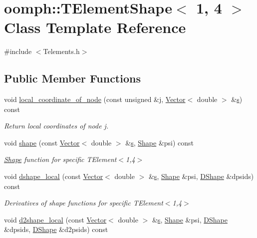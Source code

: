 \hypertarget{classoomph_1_1TElementShape_3_011_00_014_01_4}{}\section{oomph\+:\+:T\+Element\+Shape$<$ 1, 4 $>$ Class Template Reference}
\label{classoomph_1_1TElementShape_3_011_00_014_01_4}


{\ttfamily \#include $<$Telements.\+h$>$}

\subsection*{Public Member Functions}
\begin{DoxyCompactItemize}
\item 
void \hyperlink{classoomph_1_1TElementShape_3_011_00_014_01_4_a3509c3a0ef9eaab7fa760fb6cdf85f0d}{local\+\_\+coordinate\+\_\+of\+\_\+node} (const unsigned \&j, \hyperlink{classoomph_1_1Vector}{Vector}$<$ double $>$ \&\hyperlink{cfortran_8h_ab7123126e4885ef647dd9c6e3807a21c}{s}) const
\begin{DoxyCompactList}\small\item\em Return local coordinates of node j. \end{DoxyCompactList}\item 
void \hyperlink{classoomph_1_1TElementShape_3_011_00_014_01_4_a5e7f0f19e8e1d13052b7b6714ce69a59}{shape} (const \hyperlink{classoomph_1_1Vector}{Vector}$<$ double $>$ \&\hyperlink{cfortran_8h_ab7123126e4885ef647dd9c6e3807a21c}{s}, \hyperlink{classoomph_1_1Shape}{Shape} \&psi) const
\begin{DoxyCompactList}\small\item\em \hyperlink{classoomph_1_1Shape}{Shape} function for specific T\+Element$<$1,4$>$ \end{DoxyCompactList}\item 
void \hyperlink{classoomph_1_1TElementShape_3_011_00_014_01_4_afd00ae8e2a82badd8d43196481da8ce7}{dshape\+\_\+local} (const \hyperlink{classoomph_1_1Vector}{Vector}$<$ double $>$ \&\hyperlink{cfortran_8h_ab7123126e4885ef647dd9c6e3807a21c}{s}, \hyperlink{classoomph_1_1Shape}{Shape} \&psi, \hyperlink{classoomph_1_1DShape}{D\+Shape} \&dpsids) const
\begin{DoxyCompactList}\small\item\em Derivatives of shape functions for specific T\+Element$<$1,4$>$ \end{DoxyCompactList}\item 
void \hyperlink{classoomph_1_1TElementShape_3_011_00_014_01_4_ac99262361ef4652bd2da1b7a6758c935}{d2shape\+\_\+local} (const \hyperlink{classoomph_1_1Vector}{Vector}$<$ double $>$ \&\hyperlink{cfortran_8h_ab7123126e4885ef647dd9c6e3807a21c}{s}, \hyperlink{classoomph_1_1Shape}{Shape} \&psi, \hyperlink{classoomph_1_1DShape}{D\+Shape} \&dpsids, \hyperlink{classoomph_1_1DShape}{D\+Shape} \&d2psids) const
\end{DoxyCompactItemize}



